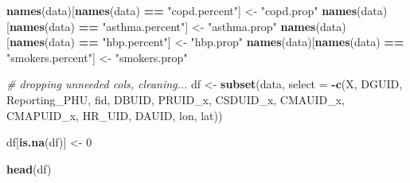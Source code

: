 \documentclass[]{article}
\newenvironment{Shaded}{\begin{snugshade}}{\end{snugshade}}
\newcommand{\CommentTok}[1]{\textcolor[rgb]{0.56,0.35,0.01}{\textit{#1}}}
\newcommand{\DataTypeTok}[1]{\textcolor[rgb]{0.13,0.29,0.53}{#1}}
\newcommand{\DecValTok}[1]{\textcolor[rgb]{0.00,0.00,0.81}{#1}}
\newcommand{\KeywordTok}[1]{\textcolor[rgb]{0.13,0.29,0.53}{\textbf{#1}}}
\newcommand{\NormalTok}[1]{#1}
\newcommand{\OperatorTok}[1]{\textcolor[rgb]{0.81,0.36,0.00}{\textbf{#1}}}
\newcommand{\StringTok}[1]{\textcolor[rgb]{0.31,0.60,0.02}{#1}}
\begin{document}
\begin{Shaded}
\begin{Highlighting}[]
\KeywordTok{names}\NormalTok{(data)[}\KeywordTok{names}\NormalTok{(data) }\OperatorTok{==}\StringTok{ "copd.percent"}\NormalTok{] \textless{}{-}}\StringTok{ "copd.prop"}
\KeywordTok{names}\NormalTok{(data)[}\KeywordTok{names}\NormalTok{(data) }\OperatorTok{==}\StringTok{ "asthma.percent"}\NormalTok{] \textless{}{-}}\StringTok{ "asthma.prop"}
\KeywordTok{names}\NormalTok{(data)[}\KeywordTok{names}\NormalTok{(data) }\OperatorTok{==}\StringTok{ "hbp.percent"}\NormalTok{] \textless{}{-}}\StringTok{ "hbp.prop"}
\KeywordTok{names}\NormalTok{(data)[}\KeywordTok{names}\NormalTok{(data) }\OperatorTok{==}\StringTok{ "smokers.percent"}\NormalTok{] \textless{}{-}}\StringTok{ "smokers.prop"}

\CommentTok{\# dropping unneeded cols, cleaning...}
\NormalTok{df \textless{}{-}}\StringTok{ }\KeywordTok{subset}\NormalTok{(data, }\DataTypeTok{select =} \OperatorTok{{-}}\KeywordTok{c}\NormalTok{(X, DGUID, Reporting\_PHU, fid, DBUID, PRUID\_x, CSDUID\_x, CMAUID\_x, CMAPUID\_x, HR\_UID, DAUID, lon, lat))}

\NormalTok{df[}\KeywordTok{is.na}\NormalTok{(df)] \textless{}{-}}\StringTok{ }\DecValTok{0}
           
\KeywordTok{head}\NormalTok{(df)}
\end{Highlighting}
\end{Shaded}
\end{document}
